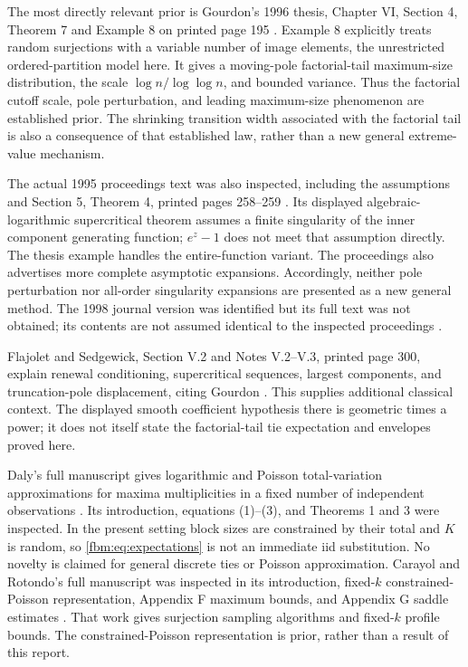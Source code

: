 \documentclass[11pt]{article}
\theoremstyle{remark}\newtheorem{remark}[theorem]{Remark}
\begin{document}
The most directly relevant prior is Gourdon's 1996 thesis, Chapter VI, Section 4, Theorem 7 and Example 8 on printed page 195 \cite{gourdonthesis}. Example 8 explicitly treats random surjections with a variable number of image elements, the unrestricted ordered-partition model here. It gives a moving-pole factorial-tail maximum-size distribution, the scale $\log n/\log\log n$, and bounded variance. Thus the factorial cutoff scale, pole perturbation, and leading maximum-size phenomenon are established prior. The shrinking transition width associated with the factorial tail is also a consequence of that established law, rather than a new general extreme-value mechanism.

The actual 1995 proceedings text was also inspected, including the assumptions and Section 5, Theorem 4, printed pages 258--259 \cite{gourdon95}. Its displayed algebraic-logarithmic supercritical theorem assumes a finite singularity of the inner component generating function; $e^z-1$ does not meet that assumption directly. The thesis example handles the entire-function variant. The proceedings also advertises more complete asymptotic expansions. Accordingly, neither pole perturbation nor all-order singularity expansions are presented as a new general method. The 1998 journal version was identified but its full text was not obtained; its contents are not assumed identical to the inspected proceedings \cite{gourdon98}.

Flajolet and Sedgewick, Section V.2 and Notes V.2--V.3, printed page 300, explain renewal conditioning, supercritical sequences, largest components, and truncation-pole displacement, citing Gourdon \cite{ac}. This supplies additional classical context. The displayed smooth coefficient hypothesis there is geometric times a power; it does not itself state the factorial-tail tie expectation and envelopes proved here.

Daly's full manuscript gives logarithmic and Poisson total-variation approximations for maxima multiplicities in a fixed number of independent observations \cite{daly}. Its introduction, equations (1)--(3), and Theorems 1 and 3 were inspected. In the present setting block sizes are constrained by their total and $K$ is random, so \eqref{fbm:eq:expectations} is not an immediate iid substitution. No novelty is claimed for general discrete ties or Poisson approximation. Carayol and Rotondo's full manuscript was inspected in its introduction, fixed-$k$ constrained-Poisson representation, Appendix F maximum bounds, and Appendix G saddle estimates \cite{carayol}. That work gives surjection sampling algorithms and fixed-$k$ profile bounds. The constrained-Poisson representation is prior, rather than a result of this report.
\end{document}

